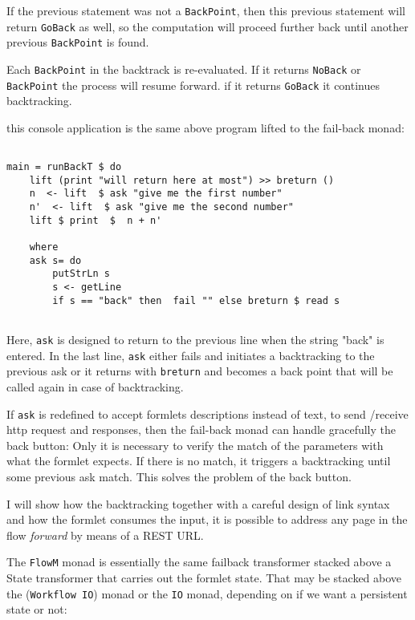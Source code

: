 \documentclass{tmr}
\begin{document}
If the previous statement was not a {\tt BackPoint}, then this  previous statement will return {\tt GoBack} as well, so the computation will proceed further back until another previous {\tt BackPoint} is found. 
 
Each {\tt BackPoint} in the backtrack is re-evaluated. If it returns {\tt NoBack} or {\tt BackPoint} the process will resume forward. if it returns {\tt GoBack} it continues backtracking. 
 
this console application is the same above program lifted to the fail-back monad: 
 
{\tt 
 
\begin{verbatim} 
 
main = runBackT $ do 
    lift (print "will return here at most") >> breturn () 
    n  <- lift  $ ask "give me the first number" 
    n'  <- lift  $ ask "give me the second number" 
    lift $ print  $  n + n' 
 
    where 
    ask s= do 
        putStrLn s 
        s <- getLine 
        if s == "back" then  fail "" else breturn $ read s 
 
\end{verbatim} 
 
} 
 
Here, {\tt ask} is designed to return to the  previous line  when the string "back" is entered. In the last line, {\tt ask} either fails and initiates a backtracking to the previous ask or it returns with {\tt breturn} and becomes a back point that will be called again in case of backtracking. 
 
If {\tt ask} is redefined to accept formlets\cite{auth:formlets} descriptions instead of text, to send /receive http request and 
responses, then the fail-back monad can handle gracefully the  back button: Only it is necessary to verify the match of the parameters with what the formlet expects. If there is no match, it triggers a backtracking until some previous ask match. This solves the problem of the back button. 
 
I will show how the backtracking together with a careful design of link syntax and how the formlet consumes the input, it is possible to address any page in the flow \textit{forward} by means of a REST URL. 
 
The {\tt FlowM} monad is essentially the same failback transformer stacked above a State transformer that carries out the formlet state. That may be stacked above the ({\tt Workflow IO}) monad or the {\tt IO} monad, depending on if we want a persistent state or not: 
 
\end{document}
